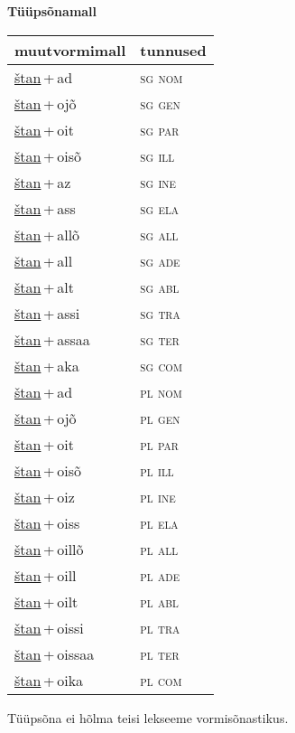 
\vspace{1.8em}
\begin{minipage}{\textwidth}
\textbf{Tüüpsõnamall \,}\\

\begin{sideways}
\begin{tabular}{l l}
muutvormimall & tunnused \\
\hline
\underline{štan}\,+\,ad & \textsc{ sg nom } \\
\underline{štan}\,+\,ojõ & \textsc{ sg gen } \\
\underline{štan}\,+\,oit & \textsc{ sg par } \\
\underline{štan}\,+\,oisõ & \textsc{ sg ill } \\
\underline{štan}\,+\,az & \textsc{ sg ine } \\
\underline{štan}\,+\,ass & \textsc{ sg ela } \\
\underline{štan}\,+\,allõ & \textsc{ sg all } \\
\underline{štan}\,+\,all & \textsc{ sg ade } \\
\underline{štan}\,+\,alt & \textsc{ sg abl } \\
\underline{štan}\,+\,assi & \textsc{ sg tra } \\
\underline{štan}\,+\,assaa & \textsc{ sg ter } \\
\underline{štan}\,+\,aka & \textsc{ sg com } \\
\underline{štan}\,+\,ad & \textsc{ pl nom } \\
\underline{štan}\,+\,ojõ & \textsc{ pl gen } \\
\underline{štan}\,+\,oit & \textsc{ pl par } \\
\underline{štan}\,+\,oisõ & \textsc{ pl ill } \\
\underline{štan}\,+\,oiz & \textsc{ pl ine } \\
\underline{štan}\,+\,oiss & \textsc{ pl ela } \\
\underline{štan}\,+\,oillõ & \textsc{ pl all } \\
\underline{štan}\,+\,oill & \textsc{ pl ade } \\
\underline{štan}\,+\,oilt & \textsc{ pl abl } \\
\underline{štan}\,+\,oissi & \textsc{ pl tra } \\
\underline{štan}\,+\,oissaa & \textsc{ pl ter } \\
\underline{štan}\,+\,oika & \textsc{ pl com } \\
\end{tabular}
\end{sideways}
\label{tab:tüüpsõnamall-štanad}

\end{minipage}

 
\vspace{1em}
\noindent Tüüpsõna ei hõlma teisi lekseeme vormi\-sõnastikus.
